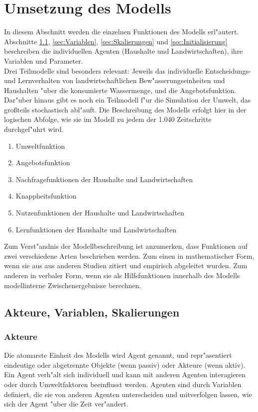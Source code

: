 \documentclass[11pt,a4paper]{article}
\begin{document}
\section{Umsetzung des Modells}
\label{sec:Umsetzung}
In diesem Abschnitt werden die einzelnen Funktionen des Modells erl"autert. Abschnitte \ref{sec:Akteure}, \ref{sec:Variablen}, \ref{sec:Skalierungen} und \ref{sec:Initialisierung} beschreiben die individuellen Agenten (Haushalte und Landwirtschaften), ihre Variablen und Parameter. \\
Drei Teilmodelle sind besonders relevant: Jeweils das individuelle Ent\-schei\-dungs- und Lern\-verhalten von land\-wirt\-schaft\-lichen Be\-w"as\-ser\-ungs\-ein\-hei\-ten und Haus\-halten "uber die konsumierte Wassermenge, und die Angebotsfunktion. Dar"uber hinaus gibt es noch ein Teilmodell f"ur die Simulation der Umwelt, das großteils stochastisch abl"auft. Die Beschreibung des Modells erfolgt hier in der logischen Abfolge, wie sie im Modell zu jedem der 1.040 Zeitschritte durchgef"uhrt wird.\\

\begin{enumerate}
\item Umweltfunktion
\item Angebotsfunktion
\item Nachfragefunktionen der Haushalte und Landwirtschaften
\item Knappheitsfunktion
\item Nutzenfunktionen der Haushalte und Landwirtschaften
\item Lernfunktionen der Haushalte und Landwirtschaften
\end{enumerate}

Zum Verst"andnis der Modellbeschreibung ist anzumerken, dass Funktionen auf zwei verschiedene Arten beschrieben werden. Zum einen in mathematischer Form, wenn sie aus aus anderen Studien zitiert und empirisch abgeleitet wurden. Zum anderen in verbaler Form, wenn sie als Hilfsfunktionen innerhalb des Modells modellinterne Zwischenergebnisse berechnen.

\subsection{Akteure, Variablen, Skalierungen}\label{sec:Akteure}
\subsubsection{Akteure}
Die atomarste Einheit des Modells wird Agent genannt, und repr"asentiert eindeutige oder abgetrennte Objekte (wenn passiv) oder Akteure (wenn aktiv). Ein Agent verh"alt sich individuell und kann mit anderen Agenten interagieren oder durch Umweltfaktoren beeinflusst werden. Agenten sind durch Variablen definiert, die sie von anderen Agenten unterscheiden und mitverfolgen lassen, wie sich der Agent "uber die Zeit ver"andert.\\
\end{document}
